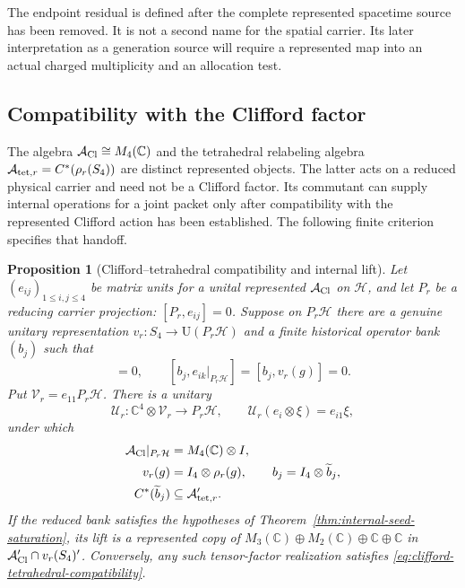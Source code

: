 \documentclass[11pt]{article}
\numberwithin{equation}{section}
\newtheorem{proposition}[theorem]{Proposition}
\theoremstyle{definition}
\theoremstyle{remark}
\newcommand{\C}{\mathbb C}
\newcommand{\U}{\mathrm U}
\newcommand{\A}{\mathcal A}
\newcommand{\Hh}{\mathcal H}
\begin{document}
The endpoint residual is defined after the complete represented spacetime
source has been removed.  It is not a second name for the spatial carrier.
Its later interpretation as a generation source will require a represented
map into an actual charged multiplicity and an allocation test.


\subsection{Compatibility with the Clifford factor}
\label{sec:clifford-tetrahedral-compatibility}

The algebra $\A_{\rm Cl}\cong M_4(\C)$ and the tetrahedral relabeling
algebra $\A_{{\rm tet},r}=C^*(\rho_r(S_4))$ are distinct represented
objects.  The latter acts on a reduced physical carrier and need not be a
Clifford factor.  Its commutant can supply internal operations for a joint
packet only after compatibility with the represented Clifford action has
been established.  The following finite criterion specifies that handoff.

\begin{proposition}[Clifford--tetrahedral compatibility and internal lift]
\label{thm:clifford-tetrahedral-compatibility}
Let $(e_{ij})_{1\le i,j\le4}$ be matrix units for a unital represented
$\A_{\rm Cl}$ on $\Hh$, and let $P_r$ be a reducing carrier projection:
$[P_r,e_{ij}]=0$.  Suppose on $P_r\Hh$ there are a genuine unitary
representation $v_r:S_4\to\U(P_r\Hh)$ and a finite historical operator
bank $(b_j)$ such that
\begin{equation}
 [v_r(g),e_{ij}|_{P_r\Hh}]=0,\qquad
 [b_j,e_{ik}|_{P_r\Hh}]=[b_j,v_r(g)]=0.
 \label{eq:clifford-tetrahedral-compatibility}
\end{equation}
Put $\mathcal V_r=e_{11}P_r\Hh$.  There is a unitary
\begin{equation}
 \mathcal U_r:\C^4\otimes\mathcal V_r\longrightarrow P_r\Hh,
 \qquad \mathcal U_r(e_i\otimes\xi)=e_{i1}\xi,
 \label{eq:clifford-reduction-unitary}
\end{equation}
under which
\begin{align}
 \A_{\rm Cl}|_{P_r\Hh}&=M_4(\C)\otimes I,\nonumber\\
 v_r(g)&=I_4\otimes\rho_r(g),\qquad
 b_j=I_4\otimes\widetilde b_j,\nonumber\\
 C^*(\widetilde b_j)&\subseteq\A_{{\rm tet},r}'.
 \label{eq:clifford-tetrahedral-lift}
\end{align}
If the reduced bank satisfies the hypotheses of
Theorem~\ref{thm:internal-seed-saturation}, its lift is a represented copy
of $M_3(\C)\oplus M_2(\C)\oplus\C\oplus\C$ in
$\A_{\rm Cl}'\cap v_r(S_4)'$.  Conversely, any such tensor-factor
realization satisfies \eqref{eq:clifford-tetrahedral-compatibility}.
\end{proposition}
\end{document}
